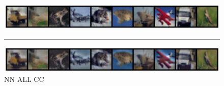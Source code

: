 \begin{figure}[h]
    \centerline{\hspace*{8mm}\includegraphics[width=1.4\textwidth]{figures/reconstruction_CIFAR10_NN_ALL_epoch_100.png}}
    \caption*{\normalsize{NN ALL CC}}
    \rule{0.4\textwidth}{.4pt}
    
    \centerline{\hspace*{8mm}\includegraphics[width=1.4\textwidth]{figures/reconstruction_CIFAR10_NN_ALL_CC_epoch_100.png}}
\end{figure}

